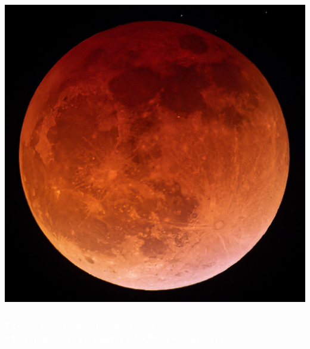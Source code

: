 \documentclass[aspectratio=169,xcolor=pdftex,dvipsnames]{beamer} %
\begin{document}
{
{
    \includegraphics[width=\paperwidth]{lunarEclipse.jpg}
}
\begin{frame}
\frametitle{\textcolor{white}{Prehistoric times: lunar eclipse.\\ Mesopotamia, 8$^{\text{th}}$ century BCE: 18-year cycle.}}
 
\end{frame}
}
\end{document}
